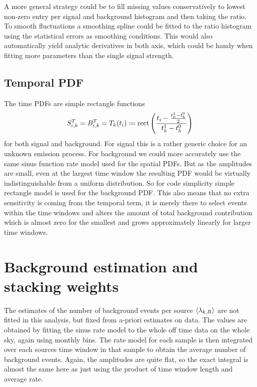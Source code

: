 A more general strategy could be to fill missing values conservatively to lowest non-zero entry per signal and background histogram and then taking the ratio.
To smooth fluctuations a smoothing spline could be fitted to the ratio histogram using the statistical errors as smoothing conditions.
This would also automatically yield analytic derivatives in both axis, which could be handy when fitting more parameters than the single signal strength.

\subsection*{Temporal PDF}
The time PDFs are simple rectangle functions
\begin{equation}
  S_{i,k}^T = B_{i,k}^T = T_k(t_i) \coloneqq
    \operatorname{rect}\left(\frac{t_i - \frac{t_k^1-t_k^0}{2}}
                              {t_k^1-t_k^0}\right)
\end{equation}
for both signal and background.
For signal this is a rather generic choice for an unknown emission process.
For background we could more accurately use the same sinus function rate model used for the spatial PDFs.
But as the amplitudes are small, even at the largest time window the resulting PDF would be virtually indistinguishable from a uniform distribution.
So for code simplicity simple rectangle model is used for the background PDF.
This also means that no extra sensitivity is coming from the temporal term, it is merely there to select events within the time windows and alters the amount of total background contribution which is almost zero for the smallest and grows approximately linearly for larger time windows.

\section{Background estimation and stacking weights}
The estimates of the number of background events per source $\Braket{\lambda_{k,B}}$ are not fitted in this analysis, but fixed from a-priori estimates on data.
The values are obtained by fitting the sinus rate model to the whole off time data on the whole sky, again using monthly bins.
The rate model for each sample is then integrated over each sources time window in that sample to obtain the average number of background events.
Again, the amplitudes are quite flat, so the exact integral is almost the same here as just using the product of time window length and average rate.

